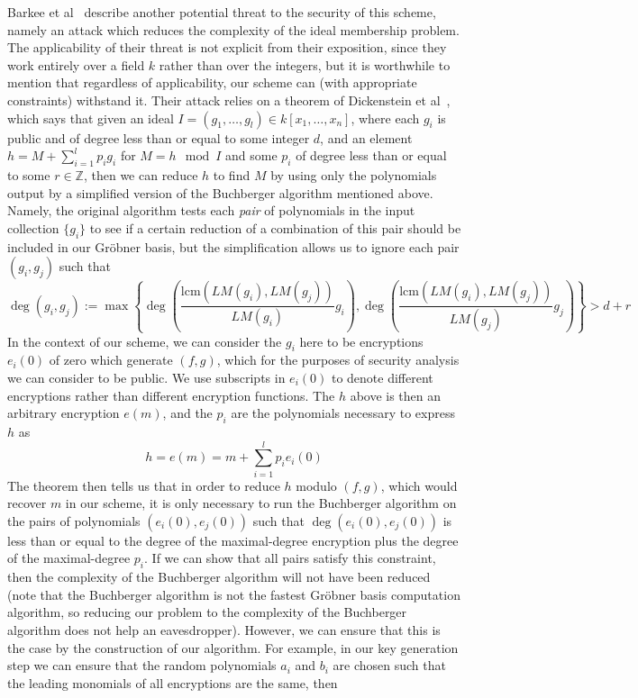 \documentclass[11pt]{report}
\newcommand{\Z}{\mathbb{Z}}
\begin{document}
Barkee et al~\cite{barkee} describe another potential threat to the security of this scheme, namely an attack which reduces the complexity of the ideal membership problem. The applicability of their threat is not explicit from their exposition, since they work entirely over a field $k$ rather than over the integers, but it is worthwhile to mention that regardless of applicability, our scheme can (with appropriate constraints) withstand it. Their attack relies on a theorem of Dickenstein et al~\cite{dickenstein}, which says that given an ideal $I=(g_1,\dots,g_l)\in k[x_1,\ldots,x_n]$, where each $g_i$ is public and of degree less than or equal to some integer $d$, and an element $h=M+\sum_{i=1}^lp_ig_i$ for $M=h\mod I$ and some $p_i$ of degree less than or equal to some $r\in\Z$, then we can reduce $h$ to find $M$ by using only the polynomials output by a simplified version of the Buchberger algorithm mentioned above. Namely, the original algorithm tests each \emph{pair} of polynomials in the input collection $\{g_i\}$ to see if a certain reduction of a combination of this pair should be included in our Gr\"obner basis, but the simplification allows us to ignore each pair $(g_i,g_j)$ such that
\[\deg(g_i,g_j) := \max\left\{\deg\left(\frac{\text{lcm}(LM(g_i),LM(g_j))}{LM(g_i)}g_i\right),
\deg\left(\frac{\text{lcm}(LM(g_i),LM(g_j))}{LM(g_j)}g_j\right)\right\}  > d+r\]
In the context of our scheme, we can consider the $g_i$ here to be encryptions $e_i(0)$ of zero which generate $(f,g)$, which for the purposes of security analysis we can consider to be public. We use subscripts in $e_i(0)$ to denote different encryptions rather than different encryption functions. The $h$ above is then an arbitrary encryption $e(m)$, and the $p_i$ are the polynomials necessary to express $h$ as
\[h = e(m) = m+\sum_{i=1}^l p_ie_i(0) \]
The theorem then tells us that in order to reduce $h$ modulo $(f,g)$, which would recover $m$ in our scheme, it is only necessary to run the Buchberger algorithm on the pairs of polynomials $(e_i(0),e_j(0))$ such that $\deg(e_i(0),e_j(0))$ is less than or equal to the degree of the maximal-degree encryption plus the degree of the maximal-degree $p_i$. If we can show that all pairs satisfy this constraint, then the complexity of the Buchberger algorithm will not have been reduced (note that the Buchberger algorithm is not the fastest Gr\"obner basis computation algorithm, so reducing our problem to the complexity of the Buchberger algorithm does not help an eavesdropper). However, we can ensure that this is the case by the construction of our algorithm. For example, in our key generation step we can ensure that the random polynomials $a_i$ and $b_i$ are chosen such that the leading monomials of all encryptions are the same, then
\end{document}
